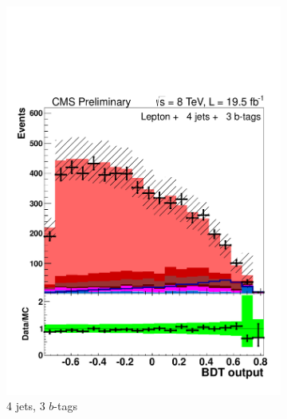 \begin{figure}[hbtp]
  \centering
  
  \begin{subfigure}[hbtp]{0.31\textwidth}
     \includegraphics[width=\textwidth]{Figures/Analysis_2_Diagrams/LJ_plots_lep/4j3t/lep_disc_final10v16_8TeV_CFMlpANN_BDT_4j3t_cumulative_wRatio_noLegend_lin.pdf}
     \caption{4 jets, 3 $b$-tags}\label{lj_BDToutput_8TeV_1}
   \end{subfigure}
   ~ %
   \begin{subfigure}[hbtp]{0.31\textwidth}

\end{subfigure}
\end{figure}
